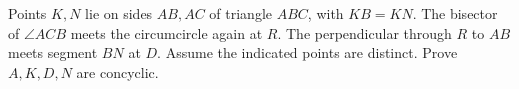 Points $K,N$ lie on sides $AB,AC$ of triangle $ABC$, with $KB=KN$. The bisector of $\angle ACB$ meets the circumcircle again at $R$. The perpendicular through $R$ to $AB$ meets segment $BN$ at $D$. Assume the indicated points are distinct. Prove $A,K,D,N$ are concyclic.
